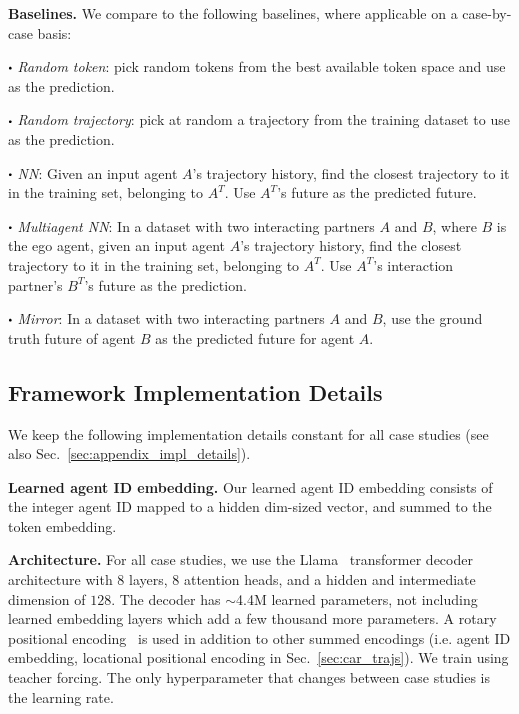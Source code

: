 \medskip \noindent \textbf{Baselines.}
We compare to the following baselines, where applicable on a case-by-case basis:

\noindent $\sbullet$ \textit{Random token}: pick random tokens from the best available token space and use as the prediction. 

\noindent $\sbullet$ \textit{Random trajectory}: pick at random a trajectory from the training dataset to use as the prediction. 

\noindent $\sbullet$ \textit{NN}: Given an input agent $A$'s trajectory history, find the closest trajectory to it in the training set, belonging to $A^T$. Use $A^T$'s future as the predicted future.

\noindent $\sbullet$ \textit{Multiagent NN}: In a dataset with two interacting partners $A$ and $B$, where $B$ is the ego agent, given an input agent $A$'s trajectory history, find the closest trajectory to it in the training set, belonging to $A^T$. Use $A^T$'s interaction partner's $B^T$'s future as the prediction.


\smallskip
\noindent $\sbullet$ \textit{Mirror}: In a dataset with two interacting partners $A$ and $B$, use the ground truth future of agent $B$ as the predicted future for agent $A$.



\subsection{Framework Implementation Details}
We keep the following implementation details constant for all case studies (see also Sec.~\ref{sec:appendix_impl_details}).

\medskip
\noindent \textbf{Learned agent ID embedding.} Our learned agent ID embedding consists of the integer agent ID mapped to a hidden dim-sized vector, and summed to the token embedding.

\medskip \noindent \textbf{Architecture.} For all case studies, we use the  Llama~\citep{touvron2023llamaopenefficientfoundation} transformer decoder architecture with $8$ layers, $8$ attention heads, and a hidden and intermediate dimension of $128$. The decoder has $\sim$4.4M learned parameters, not including learned embedding layers which add a few thousand more parameters. A rotary positional encoding~\citep{su2024roformer} is used in addition to other summed encodings (i.e. agent ID embedding, locational positional encoding in Sec.~\ref{sec:car_trajs}). We train using teacher forcing. The only hyperparameter that changes between case studies is the learning rate.
